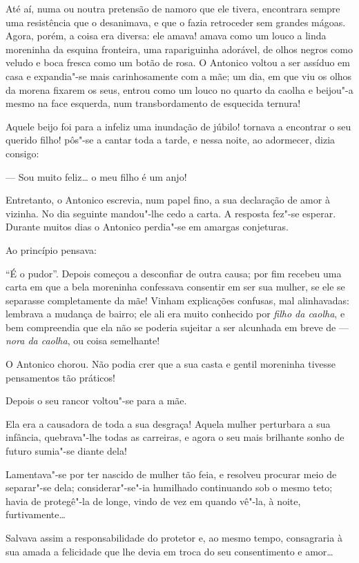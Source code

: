 Até aí, numa ou noutra pretensão de namoro que ele tivera, encontrara
sempre uma resistência que o desanimava, e que o fazia retroceder sem
grandes mágoas. Agora, porém, a coisa era diversa: ele amava! amava como
um louco a linda moreninha da esquina fronteira, uma rapariguinha
adorável, de olhos negros como veludo e boca fresca como um botão de
rosa. O Antonico voltou a ser assíduo em casa e expandia"-se mais
carinhosamente com a mãe; um dia, em que viu os olhos da morena fixarem
os seus, entrou como um louco no quarto da caolha e beijou"-a mesmo na
face esquerda, num transbordamento de esquecida ternura!

Aquele beijo foi para a infeliz uma inundação de júbilo! tornava a
encontrar o seu querido filho! pôs"-se a cantar toda a tarde, e nessa
noite, ao adormecer, dizia consigo:

--- Sou muito feliz\ldots{} o meu filho é um anjo!

Entretanto, o Antonico escrevia, num papel fino, a sua declaração de
amor à vizinha. No dia seguinte mandou"-lhe cedo a carta. A resposta
fez"-se esperar. Durante muitos dias o Antonico perdia"-se em amargas
conjeturas.

Ao princípio pensava:

``É o pudor''. Depois começou a desconfiar de outra causa; por fim
recebeu uma carta em que a bela moreninha confessava consentir em ser
sua mulher, se ele se separasse completamente da mãe! Vinham explicações
confusas, mal alinhavadas: lembrava a mudança de bairro; ele ali era
muito conhecido por \emph{filho da caolha}, e bem compreendia que ela
não se poderia sujeitar a ser alcunhada em breve de --- \emph{nora da
caolha}, ou coisa semelhante!

O Antonico chorou. Não podia crer que a sua casta e gentil moreninha
tivesse pensamentos tão práticos!

Depois o seu rancor voltou"-se para a mãe.

Ela era a causadora de toda a sua desgraça! Aquela mulher perturbara a
sua infância, quebrava"-lhe todas as carreiras, e agora o seu mais
brilhante sonho de futuro sumia"-se diante dela!

Lamentava"-se por ter nascido de mulher tão feia, e resolveu procurar
meio de separar"-se dela; considerar"-se"-ia humilhado continuando sob o
mesmo teto; havia de protegê"-la de longe, vindo de vez em quando vê"-la,
à noite, furtivamente\ldots{}

Salvava assim a responsabilidade do protetor e, ao mesmo tempo,
consagraria à sua amada a felicidade que lhe devia em troca do seu
consentimento e amor\ldots{}

